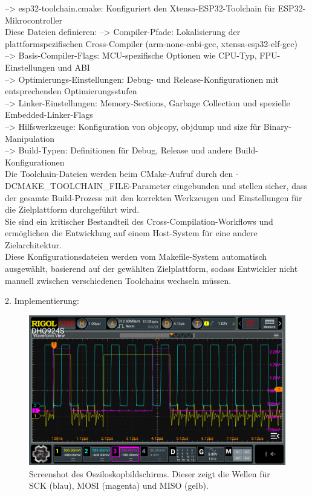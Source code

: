 	--> esp32-toolchain.cmake: Konfiguriert den Xtensa-ESP32-Toolchain für ESP32-Mikrocontroller\\
	Diese Dateien definieren:
	--> Compiler-Pfade: Lokalisierung der plattformspezifischen Cross-Compiler (arm-none-eabi-gcc, xtensa-esp32-elf-gcc)\\
	--> Basis-Compiler-Flags: MCU-spezifische Optionen wie CPU-Typ, FPU-Einstellungen und ABI\\
	--> Optimierungs-Einstellungen: Debug- und Release-Konfigurationen mit entsprechenden Optimierungsstufen\\
	--> Linker-Einstellungen: Memory-Sections, Garbage Collection und spezielle Embedded-Linker-Flags\\
	--> Hilfswerkzeuge: Konfiguration von objcopy, objdump und size für Binary-Manipulation\\
	--> Build-Typen: Definitionen für Debug, Release und andere Build-Konfigurationen\\
	Die Toolchain-Dateien werden beim CMake-Aufruf durch den -DCMAKE\_TOOLCHAIN\_FILE-Parameter eingebunden und stellen sicher, dass der gesamte Build-Prozess mit den korrekten Werkzeugen und Einstellungen für die Zielplattform durchgeführt wird.\\
	Sie sind ein kritischer Bestandteil des Cross-Compilation-Workflows und ermöglichen die Entwicklung auf einem Host-System für eine andere Zielarchitektur.\\
	Diese Konfigurationsdateien werden vom Makefile-System automatisch ausgewählt, basierend auf der gewählten Zielplattform, sodass Entwickler nicht manuell zwischen verschiedenen Toolchains wechseln müssen.

2. Implementierung:\\







\vspace{5mm}

\begin{figure}[H]
	\includegraphics[width=\textwidth]{Pics/oszi_cube_spi_example.png}
	\caption{Screenshot des Osziloskopbildschirms. Dieser zeigt die Wellen für SCK (blau), MOSI (magenta) und MISO (gelb).}
	\label{fig:oszi_cube_spi_example}
\end{figure}

